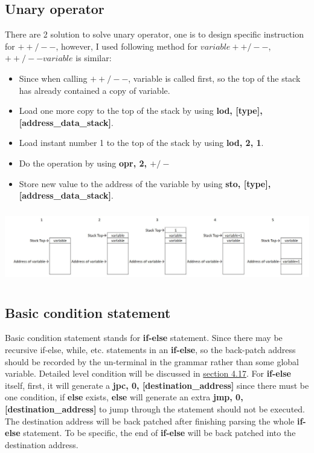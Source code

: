 \documentclass{article}
\begin{document}
		\subsection{Unary operator}
		There are 2 solution to solve unary operator, one is to design specific instruction for $ ++/-- $, however, I used following method for $ variable++/-- $, $ ++/--variable $ is similar:\\
		\begin{itemize}
		\item Since when calling $ ++/-- $, variable is called first, so the top of the stack has already contained a copy of variable.
		\item Load one more copy to the top of the stack by using \textbf{lod, [type], [address\_data\_stack]}.
		\item Load instant number 1 to the top of the stack by using \textbf{lod, 2, 1}.
		\item Do the operation by using \textbf{opr, 2, $ +/- $}
		\item Store new value to the address of the variable by using \textbf{sto, [type], [address\_data\_stack]}.
		\end{itemize}
		\centerline{\includegraphics[width=16cm, height=3.2cm]{Pic/Pic0.jpg}}
		\subsection{Basic condition statement}
		Basic condition statement stands for \textbf{if-else} statement. Since there may be recursive if-else, while, etc. statements in an \textbf{if-else}, so the back-patch address should be recorded by the un-terminal in the grammar rather than some global variable. Detailed level condition will be discussed in \hyperlink{4.17}{section 4.17}. For \textbf{if-else} itself, first, it will generate a \textbf{jpc, 0, [destination\_address]} since there must be one condition, if \textbf{else} exists, \textbf{else} will generate an extra \textbf{jmp, 0, [destination\_address]} to jump through the statement should not be executed. The destination address will be back patched after finishing parsing the whole \textbf{if-else} statement. To be specific, the end of \textbf{if-else} will be back patched into the destination address.
\end{document}
